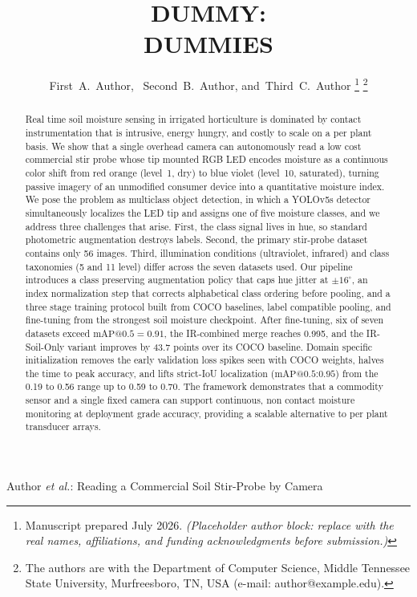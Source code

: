 ﻿\documentclass[journal]{IEEEtran}
\begin{document}
\title{DUMMY: \\
DUMMIES}

\author{First~A.~Author,~
        Second~B.~Author,
        and~Third~C.~Author%
\thanks{Manuscript prepared July 2026. \emph{(Placeholder author block: replace with the real names, affiliations, and funding acknowledgments before submission.)}}
\thanks{The authors are with the Department of Computer Science, Middle Tennessee State University, Murfreesboro, TN, USA (e-mail: author@example.edu).}}

%
{Author \MakeLowercase{\textit{et al.}}: Reading a Commercial Soil Stir-Probe by Camera}

\maketitle

\begin{abstract}
Real time soil moisture sensing in irrigated horticulture is dominated by contact instrumentation that is intrusive, energy hungry, and costly to scale on a per plant basis. We show that a single overhead camera can autonomously read a low cost commercial stir probe whose tip mounted RGB LED encodes moisture as a continuous color shift from red orange (level~1, dry) to blue violet (level~10, saturated), turning passive imagery of an unmodified consumer device into a quantitative moisture index. We pose the problem as multiclass object detection, in which a YOLOv5s detector simultaneously localizes the LED tip and assigns one of five moisture classes, and we address three challenges that arise. First, the class signal lives in hue, so standard photometric augmentation destroys labels. Second, the primary stir-probe dataset contains only 56 images. Third, illumination conditions (ultraviolet, infrared) and class taxonomies (5  and 11 level) differ across the seven datasets used. Our pipeline introduces a class preserving augmentation policy that caps hue jitter at $\pm 16^{\circ}$, an index normalization step that corrects alphabetical class ordering before pooling, and a three stage training protocol built from COCO baselines, label compatible pooling, and fine-tuning from the strongest soil moisture checkpoint. After fine-tuning, six of seven datasets exceed $\text{mAP@0.5}=0.91$, the IR-combined merge reaches 0.995, and the IR-Soil-Only variant improves by 43.7 points over its COCO baseline. Domain specific initialization removes the early validation loss spikes seen with COCO weights, halves the time to peak accuracy, and lifts strict-IoU localization ($\text{mAP@0.5{:}0.95}$) from the 0.19 to 0.56 range up to 0.59 to 0.70. The framework demonstrates that a commodity sensor and a single fixed camera can support continuous, non contact moisture monitoring at deployment grade accuracy, providing a scalable alternative to per plant transducer arrays.
\end{abstract}
\end{document}
